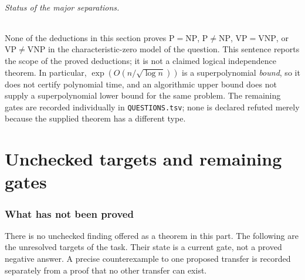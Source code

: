 \documentclass[11pt,a4paper]{article}
\begin{document}
\paragraph{Status of the major separations.}
None of the deductions in this section proves \(\mathrm P=\mathrm{NP}\),
\(\mathrm P\ne\mathrm{NP}\), \(\mathrm{VP}=\mathrm{VNP}\), or
\(\mathrm{VP}\ne\mathrm{VNP}\) in the characteristic-zero model of
the question.  This sentence reports the scope of the proved deductions;
it is not a claimed logical independence theorem.  In particular,
\(\exp(O(n/\sqrt{\log n}))\) is a superpolynomial \emph{bound},
so it does not certify polynomial time, and an algorithmic upper
bound does not supply a superpolynomial lower bound for the same
problem.  The remaining gates are recorded individually in
\texttt{QUESTIONS.tsv}; none is declared refuted merely because the
supplied theorem has a different type.


\part{Unchecked targets and remaining gates}
\label{part:open}
\section{What has not been proved}
There is no unchecked finding offered as a theorem in this part. The
following are the unresolved targets of the task. Their state is a
current gate, not a proved negative answer. A precise counterexample to
one proposed transfer is recorded separately from a proof that no other
transfer can exist.
\end{document}
